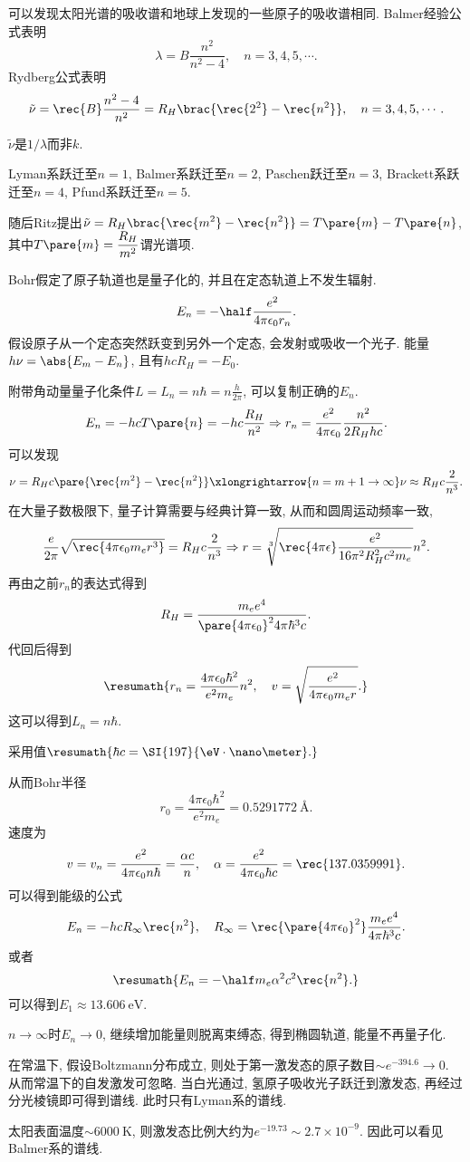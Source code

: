 \documentclass[hidelinks]{ctexart}
\begin{document}
可以发现太阳光谱的吸收谱和地球上发现的一些原子的吸收谱相同. Balmer经验公式表明
\[ \lambda = B \frac{n^2}{n^2 - 4},\quad n = 3,4,5,\cdots. \]
Rydberg公式表明
\[ \tilde{\nu} = \rec{B} \frac{n^2-4}{n^2} = R_H \brac{\rec{2^2} - \rec{n^2}},\quad n = 3,4,5,\cdots. \]
\begin{pitfall}
    $\tilde{\nu}$是$1/\lambda$而非$k$.
\end{pitfall}
\begin{remark}
    Lyman系跃迁至$n=1$, Balmer系跃迁至$n=2$, Paschen跃迁至$n=3$, Brackett系跃迁至$n=4$, Pfund系跃迁至$n=5$.
\end{remark}
随后Ritz提出$\displaystyle \tilde{\nu} = R_H \brac{\rec{m^2} - \rec{n^2}} = T\pare{m} - T\pare{n}$, 其中$\displaystyle T\pare{m} = \frac{R_H}{m^2}$谓光谱项.
\par
Bohr假定了原子轨道也是量子化的, 并且在定态轨道上不发生辐射.
\[ E_n = -\half \frac{e^2}{4\pi\epsilon_0 r_n}. \]
假设原子从一个定态突然跃变到另外一个定态, 会发射或吸收一个光子. 能量$h\nu = \abs{E_m - E_n}$, 且有$hcR_H = -E_0$.
\par
附带角动量量子化条件$\displaystyle L = L_n = n\hbar = n\frac{h}{2\pi}$, 可以复制正确的$E_n$.
\[ E_n = -hcT\pare{n} = -hc\frac{R_H}{n^2} \Rightarrow r_n = \frac{e^2}{4\pi\epsilon_0}\frac{n^2}{2R_Hhc}. \]
可以发现
\[ \nu = R_Hc\pare{\rec{m^2} - \rec{n^2}} \xlongrightarrow{n=m+1\rightarrow\infty} \nu \approx R_Hc\frac{2}{n^3}. \]
在大量子数极限下, 量子计算需要与经典计算一致, 从而和圆周运动频率一致,
\[ \frac{e}{2\pi}\sqrt{\rec{4\pi\epsilon_0 m_er^3}} = R_Hc \frac{2}{n^3} \Rightarrow r = \sqrt[3]{\rec{4\pi\epsilon}\frac{e^2}{16\pi^2 R_H^2 c^2m_e}}n^2. \]
再由之前$r_n$的表达式得到
\[ R_H = \frac{m_ee^4}{\pare{4\pi\epsilon_0}^2 4\pi\hbar^3 c}. \]
代回后得到
\[ \resumath{r_n = \frac{4\pi\epsilon_0\hbar^2}{e^2m_e}n^2,\quad v = \sqrt{\frac{e^2}{4\pi\epsilon_0 m_er}}.} \]
这可以得到$L_n = n\hbar$.
\begin{remark}
    采用值$\resumath{\hbar c = \SI{197}{\eV\cdot\nano\meter}.}$
\end{remark}
从而Bohr半径
\[ r_0 = \frac{4\pi\epsilon_0 \hbar^2}{e^2m_e} = \SI{0.5291772}{\angstrom}. \]
速度为
\[ v = v_n = \frac{e^2}{4\pi\epsilon_0 n\hbar} = \frac{\alpha c}{n},\quad \alpha = \frac{e^2}{4\pi\epsilon_0 \hbar c} = \rec{137.0359991}. \]
可以得到能级的公式
\[ E_n = -hcR_\infty \rec{n^2},\quad R_\infty= \rec{\pare{4\pi\epsilon_0}^2} \frac{m_ee^4}{4\pi \hbar^3 c}. \]
或者
\[ \resumath{E_n = -\half m_e\alpha^2 c^2 \rec{n^2}.} \]
可以得到$E_1 \approx \SI{13.606}{\eV}$.
\par
$n\rightarrow \infty$时$E_n\rightarrow 0$, 继续增加能量则脱离束缚态, 得到椭圆轨道, 能量不再量子化.
\par
在常温下, 假设Boltzmann分布成立, 则处于第一激发态的原子数目$\sim e^{-394.6}\rightarrow 0$. 从而常温下的自发激发可忽略. 当白光通过, 氢原子吸收光子跃迁到激发态, 再经过分光棱镜即可得到谱线. 此时只有Lyman系的谱线.
\par
太阳表面温度$\sim \SI{6000}{\kelvin}$, 则激发态比例大约为$e^{-19.73}\sim 2.7\times 10^{-9}$. 因此可以看见Balmer系的谱线.
\end{document}
